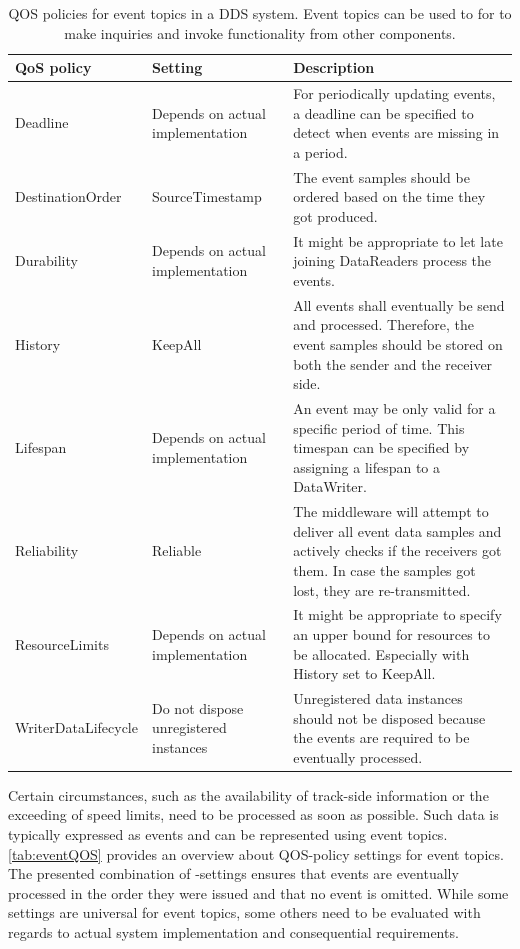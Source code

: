 \begin{table}[htbp!]
	\begin{center}
		\caption{\Gls*{QOS} policies for event topics in a \gls*{DDS} system. Event topics can be used to for  to make inquiries and invoke functionality from other components.}
		\label{tab:eventQOS}
		\begin{tabularx}{\textwidth}{|X|X|X|}
			\hline
			\textbf{QoS policy} & \textbf{Setting} & \textbf{Description}\\
			\hline \hline
			Deadline & Depends on actual implementation & For periodically updating events, a deadline can be specified to detect when events are missing in a period. \\
			\hline
			DestinationOrder & SourceTimestamp & The event samples should be ordered based on the time they got produced. \\
			\hline
			Durability & Depends on actual implementation & It might be appropriate to let late joining DataReaders process the events. \\
			\hline
			History & KeepAll & All events shall eventually be send and processed. Therefore, the event samples should be stored on both the sender and the receiver side.  \\
			\hline
			Lifespan & Depends on actual implementation & An event may be only valid for a specific period of time. This timespan can be specified by assigning a lifespan to a DataWriter. \\
			\hline
			Reliability & Reliable & The middleware will attempt to deliver all event data samples and actively checks if the receivers got them. In case the samples got lost, they are re-transmitted. \\
			\hline
			ResourceLimits & Depends on actual implementation & It might be appropriate to specify an upper bound for resources to be allocated. Especially with History set to KeepAll. \\
			\hline
			WriterDataLifecycle & Do not dispose unregistered instances & Unregistered data instances should not be disposed because the events are required to be eventually processed. \\
			\hline
		\end{tabularx}
	\end{center}
\end{table}

Certain circumstances, such as the availability of track-side information or the exceeding of speed limits, need to be processed as soon as possible.
Such data is typically expressed as events and can be represented using event topics.
\autoref{tab:eventQOS} provides an overview about \gls*{QOS}-policy settings for event topics.
The presented combination of -settings ensures that events are eventually processed in the order they were issued and that no event is omitted.
While some settings are universal for event topics, some others need to be evaluated with regards to actual system implementation and consequential requirements.



